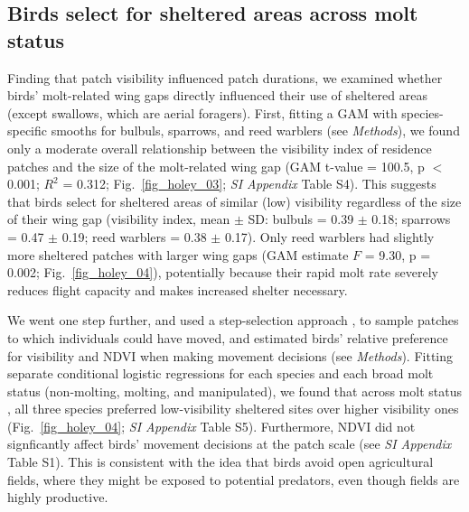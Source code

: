 \begin{refsection}
\subsection*{Birds select for sheltered areas across molt status}

Finding that patch visibility influenced patch durations, we examined whether birds' molt-related wing gaps directly influenced their use of sheltered areas (except swallows, which are aerial foragers).
First, fitting a GAM with species-specific smooths for bulbuls, sparrows, and reed warblers (see \textit{Methods}), we found only a moderate overall relationship between the visibility index of residence patches and the size of the molt-related wing gap (GAM t-value = 100.5, p $<$ 0.001; $R^2$ = 0.312; Fig.~\ref{fig_holey_03}; \textit{SI Appendix} Table S4).
This suggests that birds select for sheltered areas of similar (low) visibility regardless of the size of their wing gap (visibility index, mean $\pm$ SD: bulbuls =  0.39 $\pm$ 0.18; sparrows = 0.47 $\pm$ 0.19; reed warblers = 0.38 $\pm$ 0.17).
Only reed warblers had slightly more sheltered patches with larger wing gaps (GAM estimate $F$ = 9.30, p = 0.002; Fig.~\ref{fig_holey_04}), potentially because their rapid molt rate severely reduces flight capacity and makes increased shelter necessary.


We went one step further, and used a step-selection approach \cite{signer2019,aben2021}, to sample patches to which individuals could have moved, and estimated birds' relative preference for visibility and NDVI when making movement decisions (see \textit{Methods}).
Fitting separate conditional logistic regressions for each species and each broad molt status (non-molting, molting, and manipulated), we found that across molt status , all three species preferred low-visibility sheltered sites over higher visibility ones (Fig.~\ref{fig_holey_04}; \textit{SI Appendix} Table S5).
Furthermore, NDVI did not signficantly affect birds' movement decisions at the patch scale (see \textit{SI Appendix} Table {S1}).
This is consistent with the idea that birds avoid open agricultural fields, where they might be exposed to potential predators, even though fields are highly productive.


\end{refsection}
